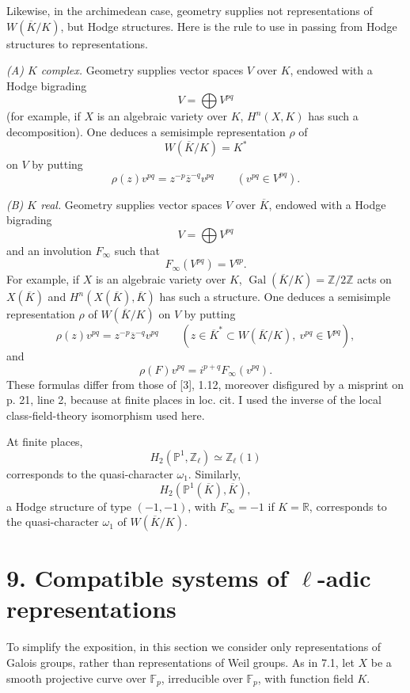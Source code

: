 \documentclass[10pt,letterpaper]{article}
\newcommand{\Z}{\mathbb Z}
\newcommand{\F}{\mathbb F}
\newcommand{\Gal}{\operatorname{Gal}}
\providecommand{\R}{\mathbb R}
\providecommand{\Gal}{\operatorname{Gal}}
\providecommand{\Gal}{\operatorname{Gal}}
\providecommand{\Gal}{\operatorname{Gal}}
\providecommand{\Gal}{\operatorname{Gal}}
\begin{document}
Likewise, in the archimedean case, geometry supplies not representations of $W(\overline K/K)$, but Hodge structures. Here is the rule to use in passing from Hodge structures to representations.

\emph{(A) $K$ complex.} Geometry supplies vector spaces $V$ over $K$, endowed with a Hodge bigrading
\[
V=\bigoplus V^{pq}
\]
(for example, if $X$ is an algebraic variety over $K$, $H^n(X,K)$ has such a decomposition). One deduces a semisimple representation $\rho$ of
\[
W(\overline K/K)=K^*
\]
on $V$ by putting
\[
\rho(z)v^{pq}=z^{-p}\overline z^{-q}v^{pq}\qquad(v^{pq}\in V^{pq}).
\]

\emph{(B) $K$ real.} Geometry supplies vector spaces $V$ over $\overline K$, endowed with a Hodge bigrading
\[
V=\bigoplus V^{pq}
\]
and an involution $F_\infty$ such that
\[
F_\infty(V^{pq})=V^{qp}.
\]
For example, if $X$ is an algebraic variety over $K$, $\Gal(\overline K/K)=\Z/2\Z$ acts on $X(\overline K)$ and $H^n(X(\overline K),\overline K)$ has such a structure. One deduces a semisimple representation $\rho$ of $W(\overline K/K)$ on $V$ by putting
\[
\rho(z)v^{pq}=z^{-p}\overline z^{-q}v^{pq}\qquad(z\in\overline K^*\subset W(\overline K/K),\ v^{pq}\in V^{pq}),
\]
and
\[
\rho(F)v^{pq}=i^{p+q}F_\infty(v^{pq}).
\]
These formulas differ from those of [3], 1.12, moreover disfigured by a misprint on p. 21, line 2, because at finite places in loc. cit. I used the inverse of the local class-field-theory isomorphism used here.

At finite places,
\[
H_2(\mathbb P^1,\Z_\ell)\simeq\Z_\ell(1)
\]
corresponds to the quasi-character $\omega_1$. Similarly,
\[
H_2(\mathbb P^1(\overline K),\overline K),
\]
a Hodge structure of type $(-1,-1)$, with $F_\infty=-1$ if $K=\R$, corresponds to the quasi-character $\omega_1$ of $W(\overline K/K)$.

\section*{9. Compatible systems of $\ell$-adic representations}

To simplify the exposition, in this section we consider only representations of Galois groups, rather than representations of Weil groups. As in 7.1, let $X$ be a smooth projective curve over $\F_p$, irreducible over $\F_p$, with function field $K$.
\end{document}
